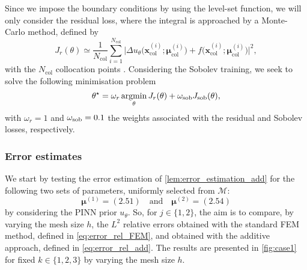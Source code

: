 Since we impose the boundary conditions by using the level-set function, we will only consider the residual loss, where the integral is approached by a Monte-Carlo method, defined by
\begin{equation*}
	J_r(\theta) \simeq
	\frac{1}{N_\text{col}} \sum_{i=1}^{N_\text{col}} \big| \Delta u_{\theta}(\bm{x}_\text{col}^{(i)};\bm{\mu}_\text{col}^{(i)}\big)+f(\bm{x}_\text{col}^{(i)};\bm{\mu}_\text{col}^{(i)}\big)\big|^2,
\end{equation*}
with the $N_\text{col}$ collocation points . Considering the Sobolev training, we seek to solve the following minimisation problem
\begin{equation*}
	\theta^\star = \omega_r\operatorname*{argmin}_\theta J_r(\theta) + \omega_\text{\rm sob} J_\text{\rm sob}(\theta),
\end{equation*}
with $\omega_r=1$ and $\omega_\text{\rm sob}=0.1$ the weights associated with the residual and Sobolev losses, respectively.

\subsubsection{Error estimates}\label{par:Lap2DAnn_error_estimations}

We start by testing the error estimation of \cref{lem:error_estimation_add} for the following two sets of parameters,
uniformly selected from $\mathcal{M}$:
\begin{equation*}
	\bm{\mu}^{(1)}=(2.51) \quad \text{and} \quad \bm{\mu}^{(2)}=(2.54)
\end{equation*}
by considering the PINN prior $u_\theta$. So, for $ j\in \{1,2\}$, the aim is to compare, by varying the mesh size $h$, the $L^2$ relative errors  obtained with the standard FEM method, defined in \eqref{eq:error_rel_FEM}, and  obtained with the additive approach, defined in \eqref{eq:error_rel_add}.
The results are presented in \cref{fig:case1} for fixed $k \in \{1,2,3\}$ by varying the mesh size $h$.


